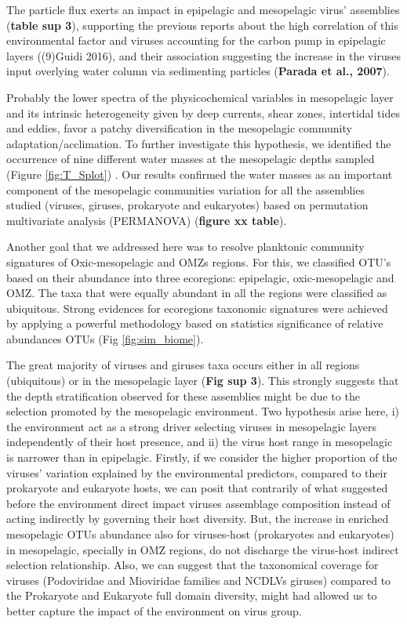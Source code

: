 \documentclass[fleqn,10pt]{wlscirep}
\begin{document}
The particle flux exerts an impact in epipelagic and mesopelagic virus’ assemblies (\textbf{table sup 3}), supporting the previous reports about the high correlation of this environmental factor and viruses accounting for the carbon pump in epipelagic layers ((9)Guidi 2016), and their association suggesting the increase in the viruses input overlying water column via sedimenting particles (\textbf{Parada et al., 2007}).

Probably the lower spectra of the physicochemical variables in mesopelagic layer and its intrinsic heterogeneity given by deep currents, shear zones, intertidal tides and eddies, favor a patchy diversification in the mesopelagic community adaptation/acclimation. To further investigate this hypothesis, we identified the occurrence of nine different water masses at the mesopelagic depths sampled (Figure \ref{fig:T_Splot}) . Our results confirmed the water masses as an important component of the mesopelagic communities variation for all the assemblies studied (viruses, giruses, prokaryote and eukaryotes) based on permutation multivariate analysis (PERMANOVA) (\textbf{figure xx table}).

Another goal that we addressed here was to resolve planktonic community signatures of Oxic-mesopelagic and OMZs regions. For this, we classified OTU’s based on their abundance into three ecoregions: epipelagic, oxic-mesopelagic and OMZ. The taxa that were equally abundant in all the regions were classified as ubiquitous. Strong evidences for ecoregions taxonomic signatures were achieved by applying a powerful methodology based on statistics significance of relative abundances OTUs (Fig \ref{fig:sim_biome}).

The great majority of viruses and giruses taxa occurs either in all regions (ubiquitous) or in the mesopelagic layer (\textbf{Fig sup 3}). This strongly suggests that the depth stratification observed for these assemblies might be due to the selection promoted by the mesopelagic environment. Two hypothesis arise here, i) the environment act as a strong driver selecting viruses in mesopelagic layers independently of their host presence, and ii) the virus host range in mesopelagic is narrower than in epipelagic. Firstly, if we consider the higher proportion of the viruses’ variation explained by the environmental predictors, compared to their prokaryote and eukaryote hosts, we can posit that contrarily of what suggested before the environment direct impact viruses assemblage composition instead of acting indirectly by governing their host diversity. But, the increase in enriched mesopelagic OTUs abundance also for viruses-host (prokaryotes and eukaryotes) in mesopelagic, specially in OMZ regions, do not discharge the virus-host indirect selection relationship. Also, we can suggest that the taxonomical coverage for viruses (Podoviridae and Mioviridae families and NCDLVs giruses) compared to the Prokaryote and Eukaryote full domain diversity, might had allowed us to better capture the impact of the environment on virus group.
\end{document}
